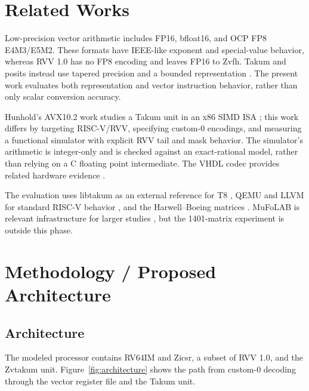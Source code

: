 \documentclass[conference]{IEEEtran}
\begin{document}
\section{Related Works}
Low-precision vector arithmetic includes FP16, bfloat16, and OCP FP8 E4M3/E5M2.
These formats have IEEE-like exponent and special-value behavior, whereas RVV
1.0 has no FP8 encoding and leaves FP16 to Zvfh. Takum and posits instead use
tapered precision and a bounded representation \cite{gustafson2017posit,
hunhold2024takum}. The present work evaluates both representation and vector
instruction behavior, rather than only scalar conversion accuracy.

Hunhold's AVX10.2 work studies a Takum unit in an x86 SIMD ISA
\cite{hunhold2025avx102}; this work differs by targeting RISC-V/RVV, specifying
custom-0 encodings, and measuring a functional simulator with explicit RVV
tail and mask behavior. The simulator's arithmetic is integer-only and is
checked against an exact-rational model, rather than relying on a C floating
point intermediate. The VHDL codec provides related hardware evidence
\cite{hunhold2024vhdl}.

The evaluation uses libtakum as an external reference for T8
\cite{libtakum}, QEMU and LLVM for standard RISC-V behavior
\cite{qemu,llvm-mc}, and the Harwell--Boeing matrices
\cite{duff1989hb}. MuFoLAB is relevant infrastructure for larger studies
\cite{mufolab}, but the 1401-matrix experiment is outside this phase.

\section{Methodology / Proposed Architecture}
\subsection{Architecture}
The modeled processor contains RV64IM and Zicsr, a subset of RVV 1.0, and the
Zvtakum unit. Figure~\ref{fig:architecture} shows the path from custom-0
decoding through the vector register file and the Takum unit.
\end{document}
